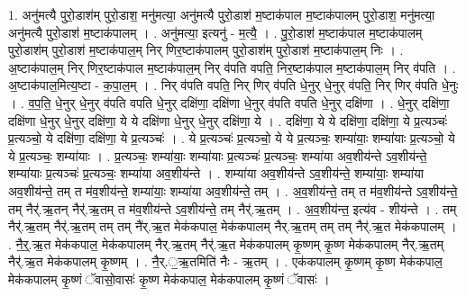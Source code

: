 \documentclass[17pt]{extarticle}
\begin{document}
1. अनु॑मत्यै पुरो॒डाश॑म् पुरो॒डाश॒ मनु॑मत्या॒ अनु॑मत्यै पुरो॒डाश॑ म॒ष्टाक॑पाल म॒ष्टाक॑पालम् पुरो॒डाश॒ मनु॑मत्या॒ अनु॑मत्यै पुरो॒डाश॑ म॒ष्टाक॑पालम् । . अनु॑मत्या॒ इत्यनु॑ - म॒त्यै॒ । . पु॒रो॒डाश॑ म॒ष्टाक॑पाल म॒ष्टाक॑पालम् पुरो॒डाश॑म् पुरो॒डाश॑ म॒ष्टाक॑पाल॒म् निर् णिर॒ष्टाक॑पालम् पुरो॒डाश॑म् पुरो॒डाश॑ म॒ष्टाक॑पाल॒म् निः । . अ॒ष्टाक॑पाल॒म् निर् णिर॒ष्टाक॑पाल म॒ष्टाक॑पाल॒म् निर् व॑पति वपति॒ निर॒ष्टाक॑पाल म॒ष्टाक॑पाल॒म् निर् व॑पति । . अ॒ष्टाक॑पाल॒मित्य॒ष्टा - क॒पा॒ल॒म् । . निर् व॑पति वपति॒ निर् णिर् व॑पति धे॒नुर् धे॒नुर् व॑पति॒ निर् णिर् व॑पति धे॒नुः । . व॒प॒ति॒ धे॒नुर् धे॒नुर् व॑पति वपति धे॒नुर् दक्षि॑णा॒ दक्षि॑णा धे॒नुर् व॑पति वपति धे॒नुर् दक्षि॑णा । . धे॒नुर् दक्षि॑णा॒ दक्षि॑णा धे॒नुर् धे॒नुर् दक्षि॑णा॒ ये ये दक्षि॑णा धे॒नुर् धे॒नुर् दक्षि॑णा॒ ये । . दक्षि॑णा॒ ये ये दक्षि॑णा॒ दक्षि॑णा॒ ये प्र॒त्यञ्चः॑ प्र॒त्यञ्चो॒ ये दक्षि॑णा॒ दक्षि॑णा॒ ये प्र॒त्यञ्चः॑ । . ये प्र॒त्यञ्चः॑ प्र॒त्यञ्चो॒ ये ये प्र॒त्यञ्चः॒ शम्या॑याः॒ शम्या॑याः प्र॒त्यञ्चो॒ ये ये प्र॒त्यञ्चः॒ शम्या॑याः । . प्र॒त्यञ्चः॒ शम्या॑याः॒ शम्या॑याः प्र॒त्यञ्चः॑ प्र॒त्यञ्चः॒ शम्या॑या अव॒शीय॑न्ते ऽव॒शीय॑न्ते॒ शम्या॑याः प्र॒त्यञ्चः॑ प्र॒त्यञ्चः॒ शम्या॑या अव॒शीय॑न्ते । . शम्या॑या अव॒शीय॑न्ते ऽव॒शीय॑न्ते॒ शम्या॑याः॒ शम्या॑या अव॒शीय॑न्ते॒ तम् त म॑व॒शीय॑न्ते॒ शम्या॑याः॒ शम्या॑या अव॒शीय॑न्ते॒ तम् । . अ॒व॒शीय॑न्ते॒ तम् त म॑व॒शीय॑न्ते ऽव॒शीय॑न्ते॒ तम् नैर्॑.ऋ॒तन् नैर्॑.ऋ॒तम् त म॑व॒शीय॑न्ते ऽव॒शीय॑न्ते॒ तम् नैर्॑.ऋ॒तम् । . अ॒व॒शीय॑न्त॒ इत्य॑व - शीय॑न्ते । . तम् नैर्॑.ऋ॒तम् नैर्॑.ऋ॒तम् तम् तम् नै॑र्.ऋ॒त मेक॑कपाल॒ मेक॑कपालम् नैर्.ऋ॒तम् तम् तम् नैर्॑.ऋ॒त मेक॑कपालम् । . नै॒र्॒.ऋ॒त मेक॑कपाल॒ मेक॑कपालम् नैर्.ऋ॒तम् नैर्॑.ऋ॒त मेक॑कपालम् कृ॒ष्णम् कृ॒ष्ण मेक॑कपालम् नैर्.ऋ॒तम् नैर्॑.ऋ॒त मेक॑कपालम् कृ॒ष्णम् । . नै॒र्.॒ऋ॒तमिति॑ नैः - ऋ॒तम् । . एक॑कपालम् कृ॒ष्णम् कृ॒ष्ण मेक॑कपाल॒ मेक॑कपालम् कृ॒ष्णं ॅवासो॒वासः॑ कृ॒ष्ण मेक॑कपाल॒ मेक॑कपालम् कृ॒ष्णं ॅवासः॑ । \newline
\end{document}
